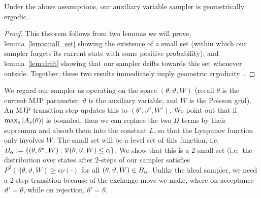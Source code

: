 \begin{theorem}
Under the above assumptions, our auxiliary variable sampler is
geometrically ergodic.  \label{thm:geom_erg}
\end{theorem}
\begin{proof}
\noindent This theorem follows from two lemmas we will prove,
lemma~\ref{lem:small_set} showing the existence of a small set (within
which our sampler forgets its
current state with some positive probability), and lemma~\ref{lem:drift}
showing that our sampler drifts towards this set whenever
outside. Together, these two results immediately imply geometric
ergodicity~\citep[Theorems 15.0.1 and Lemma 15.2.8]{meyn2012markov}.
\end{proof}
We regard our sampler as operating on the space $(\theta,\vartheta,W)$
(recall $\theta$ is the current MJP parameter, $\vartheta$ is the
auxiliary variable, and $W$ is the Poisson grid). An MJP transition step
updates this to $(\theta',\vartheta',W')$.
We point out that if ${\max_s |A_s(\theta)|}$ is bounded, then we can replace
the two $\Omega$ terms by their supremum and absorb them into the
constant $L$, so that the Lyapunov function only involves $W$.
The small set will be a level set of this function, i.e.\
$B_\alpha := \{(\theta,\theta^*,W): {\mathcal V}(\theta,\vartheta,W) \le \alpha\}$.
We show that this is a 2-small set (i.e.\ the distribution over states
after 2-steps of our sampler satisfies $P^2(\cdot|\theta,\vartheta,W)
\ge \epsilon \nu(\cdot)$ for all $(\theta,\vartheta,W) \in B_\alpha$.
Unlike the ideal sampler, we need a 2-step transition because of the
exchange move we make,
where on acceptance $\vartheta'=\theta$, while on rejection, $\theta'=\theta$.

